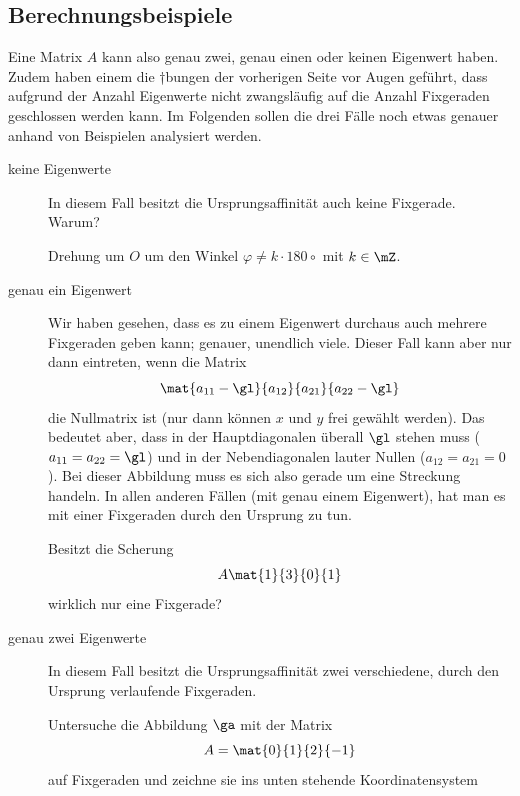 \documentclass[%
11pt,%
twoside,%
titlepage,%
german,%
headsepline%
]{scrartcl}
\begin{document}
\subsection{Berechnungsbeispiele}

Eine Matrix $A$ kann also genau zwei, genau einen oder keinen Eigenwert haben. Zudem haben einem die †bungen der vorherigen Seite vor Augen geführt, dass aufgrund der Anzahl Eigenwerte nicht zwangsläufig auf die Anzahl Fixgeraden geschlossen werden kann. Im Folgenden sollen die drei Fälle noch etwas genauer anhand von Beispielen analysiert werden.

\begin{description}
\item[keine Eigenwerte] In diesem Fall besitzt die Ursprungsaffinität auch keine Fixgerade. Warum?
\begin{bsp}
Drehung um $O$ um den Winkel $\varphi\neq k\cdot180\circ$ mit $k\in\mZ$.
\end{bsp}
\item[genau ein Eigenwert] Wir haben gesehen, dass es zu einem Eigenwert durchaus auch mehrere Fixgeraden geben kann; genauer, unendlich viele. Dieser Fall kann aber nur dann eintreten, wenn die Matrix
$$\mat{a_{11}-\gl}{a_{12}}{a_{21}}{a_{22}-\gl}$$
die Nullmatrix ist (nur dann können $x$ und $y$ frei gewählt werden). Das bedeutet aber, dass in der Hauptdiagonalen überall $\gl$ stehen muss ($a_{11}=a_{22}=\gl$) und in der Nebendiagonalen lauter Nullen ($a_{12}=a_{21}=0$). Bei dieser Abbildung muss es sich also gerade um eine Streckung handeln.
In allen anderen Fällen (mit genau einem Eigenwert), hat man es mit einer Fixgeraden durch den Ursprung zu tun.
\begin{bsp}
Besitzt die Scherung
$$A\mat{1}{3}{0}{1}$$
wirklich nur eine Fixgerade?
\end{bsp}
\item[genau zwei Eigenwerte] In diesem Fall besitzt die Ursprungsaffinität zwei verschiedene, durch den Ursprung verlaufende Fixgeraden.
\begin{bsp}
Untersuche die Abbildung $\ga$ mit der Matrix
$$A=\mat{0}{1}{2}{-1}$$
auf Fixgeraden und zeichne sie ins unten stehende Koordinatensystem
\begin{center}
\end{center}
\end{bsp}


\end{description}
\end{document}
